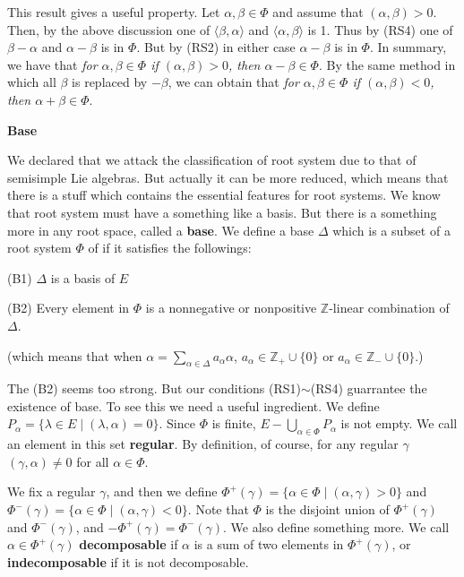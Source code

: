 \documentclass{article}
\newcommand{\InZ}{\mathbb{Z}}
\newcommand{\SBar}{\;|\;}
\begin{document}
This result gives a useful property.
Let $\alpha, \beta \in \Phi$ and assume that $(\alpha, \beta) > 0$.
Then, by the above discussion one of $\langle \beta, \alpha \rangle$ and $\langle \alpha, \beta \rangle$ is 1.
Thus by (RS4) one of $\beta - \alpha$ and $\alpha - \beta$ is in $\Phi$.
But by (RS2) in either case $\alpha - \beta$ is in $\Phi$.
In summary, we have that \textit{for $\alpha, \beta \in \Phi$ if $(\alpha, \beta) > 0$, then $\alpha - \beta \in \Phi$}.
By the same method in which all $\beta$ is replaced by $-\beta$, we can obtain that \textit{for $\alpha, \beta \in \Phi$ if $(\alpha, \beta) < 0$, then $\alpha + \beta \in \Phi$}.

\newpage

\textbf{Base}

We declared that we attack the classification of root system due to that of semisimple Lie algebras.
But actually it can be more reduced, which means that there is a stuff which contains the essential features for root systems.
We know that root system must have a something like a basis.
But there is a something more in any root space, called a \textbf{base}.
We define a base $\Delta$ which is a subset of a root system $\Phi$ of if it satisfies the followings:

(B1) $\Delta$ is a basis of $E$

(B2) Every element in $\Phi$ is a nonnegative or nonpositive $\InZ$-linear combination of $\Delta$.

(which means that when $\alpha = \sum_{\alpha \in \Delta} a_\alpha \alpha$, $a_\alpha \in \InZ_+ \cup \{0\}$ or $a_\alpha \in \InZ_- \cup \{0\}$.)

The (B2) seems too strong.
But our conditions (RS1)$\sim$(RS4) guarrantee the existence of base.
To see this we need a useful ingredient.
We define $P_\alpha = \{\lambda \in E \SBar (\lambda, \alpha) = 0\}$.
Since $\Phi$ is finite, $E - \bigcup_{\alpha \in \Phi} P_\alpha$ is not empty.
We call an element in this set \textbf{regular}.
By definition, of course, for any regular $\gamma$ $(\gamma, \alpha) \ne 0$ for all $\alpha \in \Phi$.

We fix a regular $\gamma$, and then we define $\Phi^+(\gamma) = \{\alpha \in \Phi \SBar (\alpha, \gamma) > 0\}$ and $\Phi^-(\gamma) = \{\alpha \in \Phi \SBar (\alpha, \gamma) < 0\}$.
Note that $\Phi$ is the disjoint union of $\Phi^+(\gamma)$ and $\Phi^-(\gamma)$, and $-\Phi^+(\gamma) = \Phi^-(\gamma)$.
We also define something more.
We call $\alpha \in \Phi^+(\gamma)$ \textbf{decomposable} if $\alpha$ is a sum of two elements in $\Phi^+(\gamma)$, or \textbf{indecomposable} if it is not decomposable.
\end{document}
